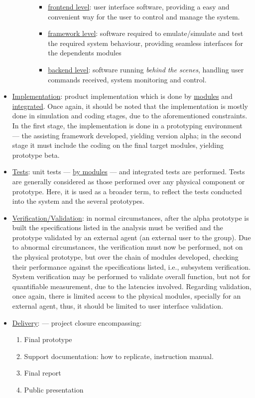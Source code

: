\begin{itemize}
\begin{itemize}
\begin{itemize}
  \begin{itemize}
  \item \uline{frontend level}: user interface software, providing a easy and convenient
    way for the user to control and manage the system.
  \item \uline{framework level}: software required to emulate/simulate and test the
    required system behaviour, providing seamless interfaces for the dependents
    modules
  \item \uline{backend level}: software running \emph{behind the scenes}, handling user
    commands received, system monitoring and control.
  \end{itemize}
\end{itemize}
\end{itemize}
\item \uline{Implementation}: product implementation which is done by \uline{modules} and
\uline{integrated}. Once again, it should be noted that the implementation is
mostly done in simulation and coding stages, due to the aforementioned
constraints. In the first stage, the implementation is done in a prototyping
environment --- the assisting framework developed, yielding version alpha; in the second stage
it must include the coding on the final target modules, yielding
prototype beta.
\item \uline{Tests}: unit tests --- \uline{by modules} --- and integrated tests are
performed. Tests are generally considered as those performed over any physical
component or prototype. Here, it is used as a broader term, to reflect the tests
conducted into the system and the several prototypes.
\item \uline{Verification/Validation}: in normal circumstances, after the alpha
  prototype is built the specifications listed in the analysis must be verified
  and the prototype validated by an external agent (an external user to the
  group). Due to abnormal circumstances, the verification must now be performed,
  not on the physical prototype, but over the chain of modules developed,
  checking their performance against the specifications listed, i.e., subsystem
  verification. System verification may be performed to validate overall
  function, but not for quantifiable measurement, due to the latencies
  involved. Regarding validation, once again, there is limited access to the
  physical modules, specially for an external agent, thus, it should be limited
  to user interface validation.
\item \uline{Delivery}: --- project closure encompassing:
\begin{enumerate}
\item Final prototype
\item Support documentation: how to replicate, instruction manual.
\item Final report
\item Public presentation
\end{enumerate}
\end{itemize}
